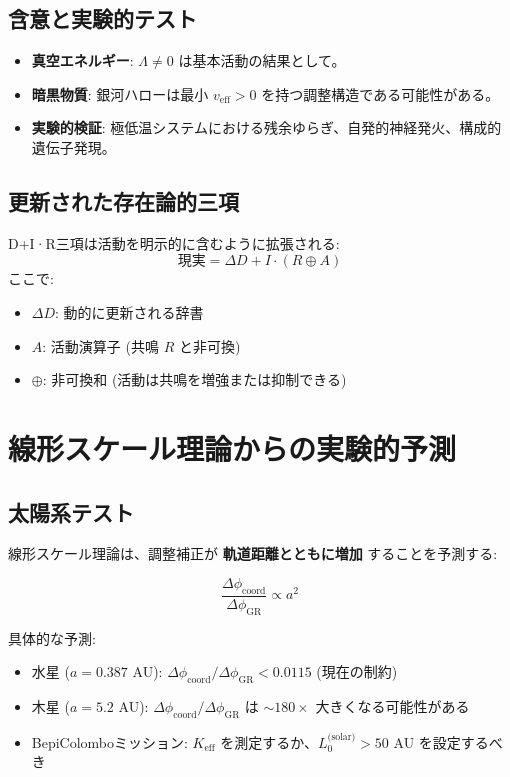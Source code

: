 \documentclass[11pt,a4paper]{article}
\begin{document}
	\subsection{含意と実験的テスト}
	
	\begin{itemize}
		\item \textbf{真空エネルギー}: $\Lambda \neq 0$ は基本活動の結果として。
		\item \textbf{暗黒物質}: 銀河ハローは最小 $v_{\mathrm{eff}} > 0$ を持つ調整構造である可能性がある。
		\item \textbf{実験的検証}: 極低温システムにおける残余ゆらぎ、自発的神経発火、構成的遺伝子発現。
	\end{itemize}
	
	\subsection{更新された存在論的三項}
	
	D+I·R三項は活動を明示的に含むように拡張される:
	\[
	\boxed{\mathrm{現実} = \Delta D + I \cdot (R \oplus A)}
	\]
	ここで:
	\begin{itemize}
		\item $\Delta D$: 動的に更新される辞書
		\item $A$: 活動演算子 (共鳴 $R$ と非可換)
		\item $\oplus$: 非可換和 (活動は共鳴を増強または抑制できる)
	\end{itemize}
	
	\section{線形スケール理論からの実験的予測}
	\label{sec:scale-predictions}
	
	\subsection{太陽系テスト}
	
	線形スケール理論は、調整補正が \textbf{軌道距離とともに増加} することを予測する:
	
	\begin{equation}
		\frac{\Delta\phi_{\text{coord}}}{\Delta\phi_{\text{GR}}} \propto a^2
	\end{equation}
	
	具体的な予測:
	\begin{itemize}
		\item 水星 ($a = 0.387$ AU): $\Delta\phi_{\text{coord}}/\Delta\phi_{\text{GR}} < 0.0115$ (現在の制約)
		\item 木星 ($a = 5.2$ AU): $\Delta\phi_{\text{coord}}/\Delta\phi_{\text{GR}}$ は $\sim 180\times$ 大きくなる可能性がある
		\item BepiColomboミッション: $K_{\mathrm{eff}}$ を測定するか、$L_0^{\text{(solar)}} > 50$ AU を設定するべき
	\end{itemize}
	
\end{document}
